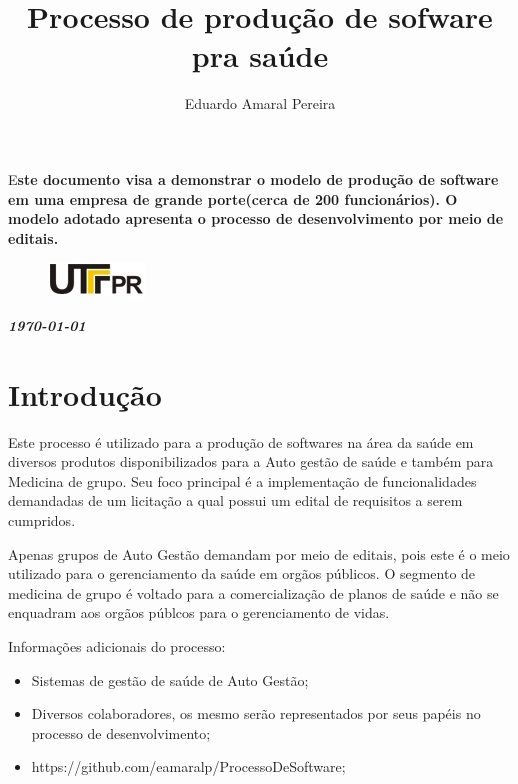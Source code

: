 \documentclass[	DIV=calc,%
							paper=a4,%
							fontsize=12pt,%
							onecolumn]{scrartcl}	 					%
\title{Processo de produção de sofware pra saúde}		%
\author{Eduardo Amaral Pereira }  	%
\date{}																				%
\newcommand{\initial}[1]{%
     \lettrine[lines=3,lhang=0.3,nindent=0em]{
     				\color{DarkGoldenrod}
     				{\textsf{#1}}}{}}
\begin{document}
\maketitle
\thispagestyle{fancy} 	
\thispagestyle{empty}		%


\initial{E}\textbf{ste documento visa a demonstrar o modelo de produção de software em uma empresa de grande porte(cerca de 200 funcionários). O modelo adotado apresenta o processo de desenvolvimento por meio de editais.}

\begin{figure}
	\centering
	\includegraphics{utfpr}
\end{figure}

\vspace{3cm}
\centerline{\textit{\textbf{\today}}}

\clearpage

\section{Introdução}
Este processo é utilizado para a produção de softwares na área da saúde em diversos produtos disponibilizados para
a Auto gestão de saúde e também para Medicina de grupo. Seu foco principal é a implementação de funcionalidades demandadas
de um licitação a qual possui um edital de requisitos a serem cumpridos.

Apenas grupos de Auto Gestão demandam por meio de editais, pois este é o meio utilizado para o gerenciamento da saúde
em orgãos públicos. O segmento de medicina de grupo é voltado para a comercialização de planos de saúde e não se enquadram
aos orgãos públcos para o gerenciamento de vidas.

Informações adicionais do processo:

\begin{itemize}
	\item Sistemas de gestão de saúde de Auto Gestão;
	\item Diversos colaboradores, os mesmo serão representados por seus papéis no processo de desenvolvimento;
	\item https://github.com/eamaralp/ProcessoDeSoftware;
\end{itemize}
\end{document}
